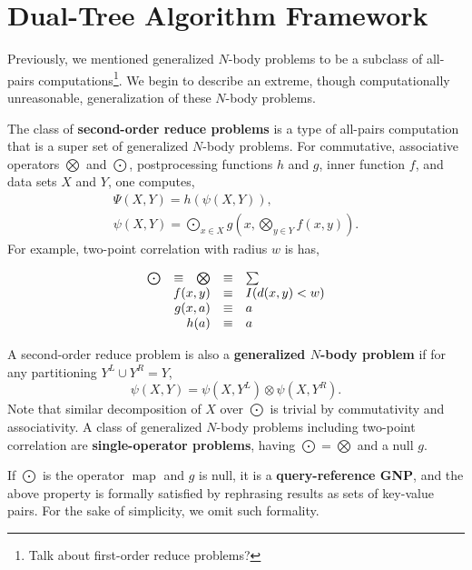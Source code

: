 \documentclass[twoside,leqno,twocolumn]{article}
\newcommand{\union}{\cup}
\DeclareMathOperator*{\map}{map}
\newcommand{\Gnp}{\Psi}
\newcommand{\gnp}{\psi}
\newcommand{\defterm}[1]{{\bf #1}}
\newcommand{\kdleft}[1]{#1^{\!L}}
\newcommand{\kdright}[1]{#1^{\!R}}
\begin{document}
\section{Dual-Tree Algorithm Framework}

Previously, we mentioned generalized $N$-body problems to be a subclass of all-pairs computations\footnote{Talk about first-order reduce problems?}.
We begin to describe an extreme, though computationally unreasonable, generalization of these $N$-body problems.

The class of \defterm{second-order reduce problems} is a type of all-pairs computation that is a super set of generalized $N$-body problems.
For commutative, associative operators $\bigotimes$ and $\bigodot$, postprocessing functions $h$ and $g$, inner function $f$, and data sets $X$ and $Y$, one computes,
\[\begin{array}{l}
  \displaystyle \Gnp(X, Y) = h(\gnp(X, Y)),
  \\
  \displaystyle \gnp(X, Y) = \bigodot_{x \in X} g\!\left(x, \bigotimes_{y \in Y} f(x, y) \right).
\end{array}\]
\noindent
For example, two-point correlation with radius $w$ is has,

\[\begin{array}{ccccl}
  \bigodot &\equiv& \bigotimes &\equiv& \sum
  \\
  \multicolumn{3}{r}{f(x,y)} &\equiv& I(d(x,y) < w)
  \\
  \multicolumn{3}{r}{g(x, a)} &\equiv& a
  \\
  \multicolumn{3}{r}{h(a)} &\equiv& a
\end{array}\]

A second-order reduce problem is also a \defterm{generalized $N$-body problem} if for any partitioning $\kdleft{Y} \union \kdright{Y} = Y$,
\[\gnp(X,Y) = \gnp(X,\kdleft{Y}) \otimes \gnp(X,\kdright{Y}).\]
\noindent Note that similar decomposition of $X$ over $\bigodot$ is trivial by commutativity and associativity.
A class of generalized $N$-body problems including two-point correlation are \defterm{single-operator problems}, having $\bigodot = \bigotimes$ and a null $g$.

If $\bigodot$ is the operator $\map$ and $g$ is null, it is a \defterm{query-reference GNP}, and the above property is formally satisfied by rephrasing results as sets of key-value pairs.
For the sake of simplicity, we omit such formality.
\end{document}
